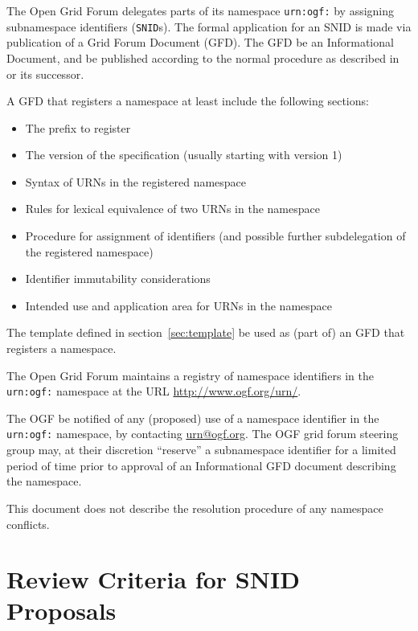 \documentclass[12pt]{article}  %
\begin{document}
The Open Grid Forum delegates parts of its namespace \texttt{urn:ogf:} by
assigning subnamespace identifiers (\texttt{SNID}s). The formal application
for an SNID is made via publication of a Grid Forum Document (GFD). The GFD
\SHOULD{} be an Informational Document, and \MUST{} be published according to the
normal procedure as described in \cite{gfd152} or its successor.

A GFD that registers a namespace \MUST{} at least include the following sections:
\begin{itemize}
    \item The prefix to register
    \item The version of the specification (usually starting with version 1)
    \item Syntax of URNs in the registered namespace
    \item Rules for lexical equivalence of two URNs in the namespace
    \item Procedure for assignment of identifiers (and possible further subdelegation of the registered namespace)
    \item Identifier immutability considerations
    \item Intended use and application area for URNs in the namespace
\end{itemize}
The template defined in section~\ref{sec:template} \MAY{} be used as
(part of) an GFD that registers a namespace.

The Open Grid Forum maintains a registry of namespace identifiers in the 
\texttt{urn:ogf:} namespace at the URL \url{http://www.ogf.org/urn/}.

The OGF \MUST{} be notified of any (proposed) use of a namespace identifier in the 
\texttt{urn:ogf:} namespace, by contacting \href{mailto:urn@ogf.org}{urn@ogf.org}.
The OGF grid forum steering group may, at their discretion “reserve” a
subnamespace identifier for a limited period of time prior to approval of
an Informational GFD document describing the namespace.

This document does not describe the resolution procedure of any namespace
conflicts.

\section{Review Criteria for SNID Proposals}%
\label{sec:review}
\end{document}
